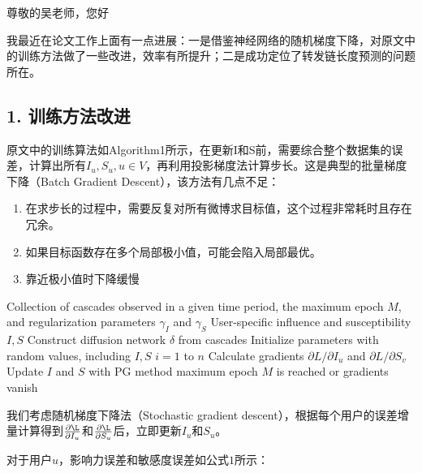 \documentclass[UTF8]{ctexart}
\begin{document}
\par 尊敬的吴老师，您好
\newline
\par
我最近在论文工作上面有一点进展：一是借鉴神经网络的随机梯度下降，对原文中的训练方法做了一些改进，效率有所提升；二是成功定位了转发链长度预测的问题所在。
\subsection*{1. 训练方法改进}
\par 
原文中的训练算法如Algorithm1所示，在更新I和S前，需要综合整个数据集的误差，计算出所有$I_{u},S_{u},u\in V$，再利用投影梯度法计算步长。这是典型的批量梯度下降（Batch Gradient Descent），该方法有几点不足：
\begin{enumerate}[\indent 1)]
    \item 在求步长的过程中，需要反复对所有微博求目标值，这个过程非常耗时且存在冗余。
    \item 如果目标函数存在多个局部极小值，可能会陷入局部最优。
    \item 靠近极小值时下降缓慢
\end{enumerate}
\begin{codebox}[\indent ]
\zi {} Collection of cascades observed in a given time period, the maximum epoch $M$, 
\zi and regularization parameters $\gamma_{I}$ and $\gamma_{S}$
\zi {} User-specific influence and susceptibility $I,S$
\zi
\zi Construct diffusion network $\delta$ from cascades
\zi Initialize parameters with random values, including $I,S$
\zi \Indentmore {}
\zi \Indentmore {} $i=1$ to $n$ 
\zi   Calculate gradients $\partial L/ \partial I_{u}$ and $\partial L/ \partial S_{v}$
    \End 
\zi Update $I$ and $S$ with PG method
    \End 
\zi {} maximum epoch $M$ is reached or gradients vanish
\end{codebox}

\par
我们考虑随机梯度下降法（Stochastic gradient descent），根据每个用户的误差增量计算得到$\frac{\partial \L}{\partial I_{u}}$和$\frac{\partial \L}{\partial S_{u}}$后，立即更新$I_{u}$和$S_{u}$。
\par
对于用户$u$，影响力误差和敏感度误差如公式$1$所示：
\end{document}
